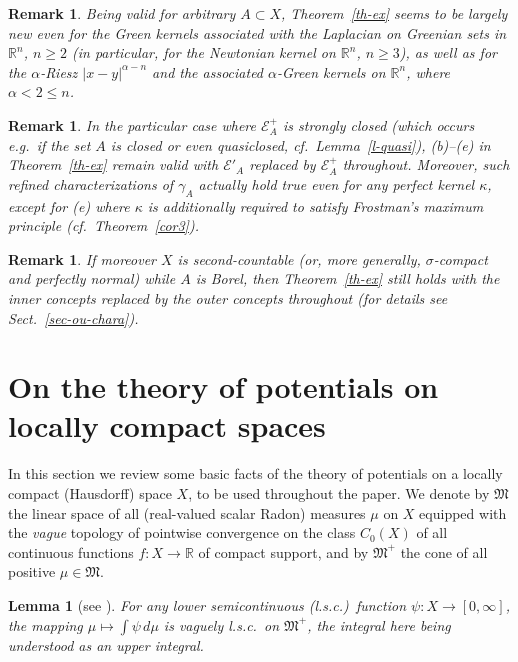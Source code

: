 \documentclass[12pt,a4paper,reqno]{amsart} %
\theoremstyle{lause}
\theoremstyle{maaritelma}
\theoremstyle{lause}
\newtheorem{lemma}[theorem]{Lemma}
\theoremstyle{maaritelma}
\newtheorem{remark}[theorem]{Remark}
\numberwithin{equation}{section}
\begin{document}
\begin{remark}Being valid for {\it arbitrary\/} $A\subset X$, Theorem~\ref{th-ex} seems to be largely new even for the Green kernels associated with the Laplacian on Greenian sets in $\mathbb R^n$, $n\geqslant2$ (in particular, for the Newtonian kernel on $\mathbb R^n$, $n\geqslant3$), as well as for the $\alpha$-Riesz $|x-y|^{\alpha-n}$ and the associated $\alpha$-Green kernels on $\mathbb R^n$, where $\alpha<2\leqslant n$.\end{remark}

\begin{remark}\label{rem2-intr}In the particular case where $\mathcal E^+_A$ is {\it strongly closed\/} (which occurs e.g.\ if the set $A$ is closed or even quasiclosed, cf.\ Lemma~\ref{l-quasi}), (b)--(e) in Theorem~\ref{th-ex} remain valid with $\mathcal E'_A$ replaced by $\mathcal E^+_A$ throughout. Moreover, such refined characterizations of $\gamma_A$ actually hold true even for {\it any perfect\/} kernel $\kappa$, except for (e) where $\kappa$ is additionally required to satisfy Frostman's maximum principle (cf.\ Theorem~\ref{cor3}).\end{remark}

\begin{remark}If moreover $X$ is sec\-ond-count\-able (or, more generally, $\sigma$-compact and perfectly normal) while $A$ is Borel, then Theorem~\ref{th-ex} still holds with the inner concepts replaced by the {\it outer\/} concepts throughout (for details see Sect.~\ref{sec-ou-chara}).\end{remark}

\section{On the theory of potentials on locally compact spaces}\label{sec-1}

In this section we review some basic facts of the theory of potentials on a locally compact (Hausdorff) space $X$, to be used throughout the paper. We denote by $\mathfrak M$
the linear space of all (real-valued scalar Radon) measures $\mu$ on $X$ equipped with the {\it vague\/} topology of pointwise convergence on the class $C_0(X)$
of all continuous functions $f:X\to\mathbb R$ of compact support,
and by $\mathfrak M^+$ the cone of all positive $\mu\in\mathfrak M$.

\begin{lemma}[{\rm see \cite[Section~IV.1, Proposition~4]{B2}}]\label{lemma-semi}For any lower semicontinuous\/ {\rm(}l.s.c.{\rm)}\  function\/ $\psi:X\to[0,\infty]$, the mapping\/ $\mu\mapsto\int\psi\,d\mu$ is
vaguely l.s.c.\ on\/ $\mathfrak M^+$, the integral here being understood as an upper integral.\end{lemma}
\end{document}
